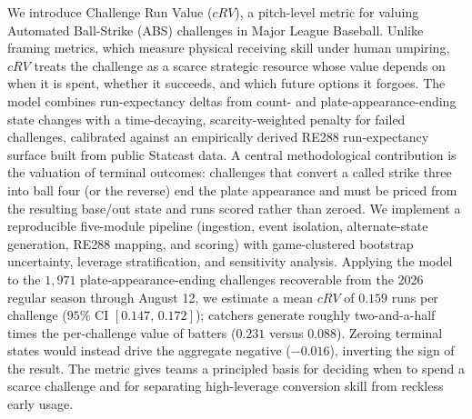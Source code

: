 We introduce Challenge Run Value ($cRV$), a pitch-level metric for valuing
Automated Ball-Strike (ABS) challenges in Major League Baseball. Unlike
framing metrics, which measure physical receiving skill under human umpiring,
$cRV$ treats the challenge as a scarce strategic resource whose value depends
on when it is spent, whether it succeeds, and which future options it
forgoes. The model combines run-expectancy deltas from count- and
plate-appearance-ending state changes with a time-decaying, scarcity-weighted
penalty for failed challenges, calibrated against an empirically derived
RE288 run-expectancy surface built from public Statcast data. A central
methodological contribution is the valuation of terminal outcomes: challenges
that convert a called strike three into ball four (or the reverse) end the
plate appearance and must be priced from the resulting base/out state and
runs scored rather than zeroed. We implement a reproducible five-module
pipeline (ingestion, event isolation, alternate-state generation, RE288
mapping, and scoring) with game-clustered bootstrap uncertainty, leverage
stratification, and sensitivity analysis. Applying the model to the $1{,}971$
plate-appearance-ending challenges recoverable from the 2026 regular season
through August 12, we estimate a mean $cRV$ of $0.159$ runs per challenge
($95\%$ CI $[0.147,\,0.172]$); catchers generate roughly two-and-a-half times
the per-challenge value of batters ($0.231$ versus $0.088$). Zeroing terminal
states would instead drive the aggregate negative ($-0.016$), inverting the
sign of the result. The metric gives teams a principled basis for deciding
when to spend a scarce challenge and for separating high-leverage conversion
skill from reckless early usage.
